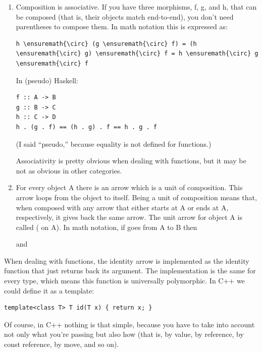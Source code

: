 \begin{enumerate}
\item
Composition is associative. If you have three morphisms, f, g, and h,
that can be composed (that is, their objects match end-to-end), you
don't need parentheses to compose them. In math notation this is
expressed as:

\begin{Verbatim}[commandchars=\\\{\}]
h \ensuremath{\circ} (g \ensuremath{\circ} f) = (h \ensuremath{\circ} g) \ensuremath{\circ} f = h \ensuremath{\circ} g \ensuremath{\circ} f
\end{Verbatim}
In (pseudo) Haskell:

\begin{Verbatim}[commandchars=\\\{\}]
f :: A -> B
g :: B -> C
h :: C -> D
h . (g . f) == (h . g) . f == h . g . f
\end{Verbatim}
(I said ``pseudo,'' because equality is not defined for functions.)

Associativity is pretty obvious when dealing with functions, but it may
be not as obvious in other categories.

\item
For every object A there is an arrow which is a unit of composition.
This arrow loops from the object to itself. Being a unit of composition
means that, when composed with any arrow that either starts at A or ends
at A, respectively, it gives back the same arrow. The unit arrow for
object A is called  ( on A). In math
notation, if  goes from A to B then


and

\end{enumerate}
When dealing with functions, the identity arrow is implemented as the
identity function that just returns back its argument. The
implementation is the same for every type, which means this function is
universally polymorphic. In C++ we could define it as a template:

\begin{Verbatim}
template<class T> T id(T x) { return x; }
\end{Verbatim}
Of course, in C++ nothing is that simple, because you have to take into
account not only what you're passing but also how (that is, by value, by
reference, by const reference, by move, and so on).

